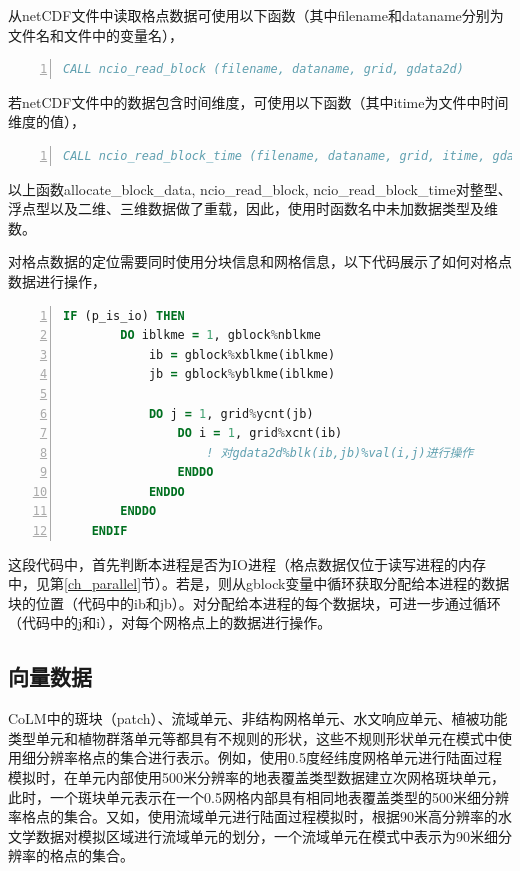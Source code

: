 从netCDF文件中读取格点数据可使用以下函数（其中filename和dataname分别为文件名和文件中的变量名），
\begin{lstlisting}[language=fortran, basicstyle=\linespread{1.0}\footnotesize\ttfamily, commentstyle=\color{olive}, numbers=left, numberstyle=\tiny, xleftmargin=1.5em,xrightmargin=0em, aboveskip=1em]
   CALL ncio_read_block (filename, dataname, grid, gdata2d)
\end{lstlisting}

若netCDF文件中的数据包含时间维度，可使用以下函数（其中itime为文件中时间维度的值），
\begin{lstlisting}[language=fortran, basicstyle=\linespread{1.0}\footnotesize\ttfamily, commentstyle=\color{olive}, numbers=left, numberstyle=\tiny, xleftmargin=1.5em,xrightmargin=0em, aboveskip=1em]
   CALL ncio_read_block_time (filename, dataname, grid, itime, gdata2d)
\end{lstlisting}

以上函数allocate\_block\_data, ncio\_read\_block, ncio\_read\_block\_time对整型、浮点型以及二维、三维数据做了重载，因此，使用时函数名中未加数据类型及维数。

对格点数据的定位需要同时使用分块信息和网格信息，以下代码展示了如何对格点数据进行操作，
\begin{lstlisting}[language=fortran, basicstyle=\linespread{1.0}\footnotesize\ttfamily, commentstyle=\color{olive}, numbers=left, numberstyle=\tiny, xleftmargin=1.5em,xrightmargin=0em, aboveskip=1em]
    IF (p_is_io) THEN
        DO iblkme = 1, gblock%nblkme
            ib = gblock%xblkme(iblkme)
            jb = gblock%yblkme(iblkme)

            DO j = 1, grid%ycnt(jb)
                DO i = 1, grid%xcnt(ib)
                    ! 对gdata2d%blk(ib,jb)%val(i,j)进行操作
                ENDDO
            ENDDO
        ENDDO
    ENDIF
\end{lstlisting}
这段代码中，首先判断本进程是否为IO进程（格点数据仅位于读写进程的内存中，见第\ref{ch_parallel}节）。若是，则从gblock变量中循环获取分配给本进程的数据块的位置（代码中的ib和jb）。对分配给本进程的每个数据块，可进一步通过循环（代码中的j和i），对每个网格点上的数据进行操作。

\subsection{向量数据}

CoLM中的斑块（patch）、流域单元、非结构网格单元、水文响应单元、植被功能类型单元和植物群落单元等都具有不规则的形状，这些不规则形状单元在模式中使用细分辨率格点的集合进行表示。例如，使用0.5\textdegree 度经纬度网格单元进行陆面过程模拟时，在单元内部使用500米分辨率的地表覆盖类型数据建立次网格斑块单元，此时，一个斑块单元表示在一个0.5\textdegree 网格内部具有相同地表覆盖类型的500米细分辨率格点的集合。又如，使用流域单元进行陆面过程模拟时，根据90米高分辨率的水文学数据对模拟区域进行流域单元的划分，一个流域单元在模式中表示为90米细分辨率的格点的集合。


